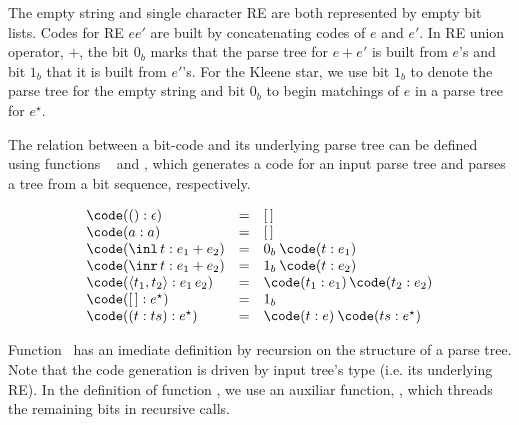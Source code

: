 The empty string and single character RE are both represented by empty bit lists. Codes for RE $ee'$ are
built by concatenating codes of $e$ and $e'$. In RE union operator, $+$, the bit $0_b$ marks that the
parse tree for $e + e'$  is built from $e$'s and bit $1_b$ that it is built from $e'$'s. For the Kleene
star, we use bit $1_b$ to denote the parse tree for the empty string and bit $0_b$ to begin matchings of $e$
in a parse tree for $e^\star$.


The relation between a bit-code and its underlying parse tree can be defined using functions
\code~ and \decodee, which generates a code for an input parse tree and parses a tree from a bit sequence, 
respectively. 



\[
\begin{array}{lcl}
   \code (() : \epsilon) & = & [\,]\\
   \code (a : a)         & = & [\,]\\
   \code (\inl\,t : e_1 + e_2) & = & 0_b\:\code(t : e_1)\\ 
   \code (\inr\,t : e_1 + e_2) & = & 1_b\:\code(t : e_2)\\
   \code (\langle t_1, t_2\rangle : e_1\,e_2) & = & \code (t_1 : e_1)\,\code(t_2 : e_2)\\
   \code ([\,] : e^\star) & = & 1_b\\
   \code ((t : ts) : e^\star) & = & \code (t : e)\:\code(ts : e^\star)\\ 
\end{array}
\]

Function \code$\,$ has an imediate definition by recursion on the structure of a parse tree.
Note that the code generation is driven by input tree's type (i.e. its underlying RE).
In the definition of function \decodee, we use an auxiliar function, \decodeo, which 
threads the remaining bits in recursive calls.

